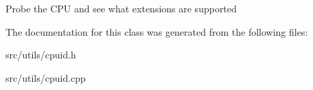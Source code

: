 Probe the C\-P\-U and see what extensions are supported 

The documentation for this class was generated from the following files\-:\begin{DoxyCompactItemize}
\item 
src/utils/cpuid.\-h\item 
src/utils/cpuid.\-cpp\end{DoxyCompactItemize}
